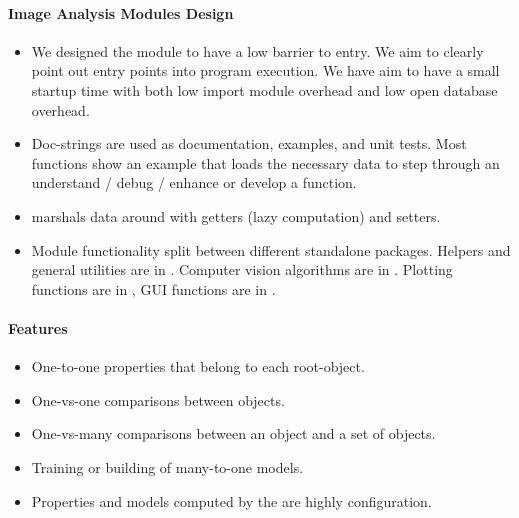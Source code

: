     \paragraph{Image Analysis Modules Design}
        \begin{itemize}

            \item We designed the module to have a low barrier to
              entry.
            We aim to clearly point out entry points into program
              execution.
            We have aim to have a small startup time with both low
              import module overhead and low open database overhead.

            \item Doc-strings are used as documentation, examples, and
              unit tests.
            Most functions show an example that loads the necessary
              data to step through an understand / debug / enhance or
              develop a function.

            \item \Depcache{} marshals data around with getters (lazy
              computation) and setters.

            \item Module functionality split between different
              standalone packages.
            Helpers and general utilities are in \utool{}.
            Computer vision algorithms are in \vtool{}.
            Plotting functions are in \plottool{}, GUI functions are
              in \guitool{}.
        \end{itemize}

     \paragraph{Features}
         \begin{itemize}
             \item One-to-one properties that belong to each
                 root-object.
             \item One-vs-one comparisons between objects.
             \item One-vs-many comparisons between an object and a set of
                 objects.
             \item Training or building of many-to-one models.
             \item Properties and models computed by the \depcache{} are
                 highly configuration.
         \end{itemize}



